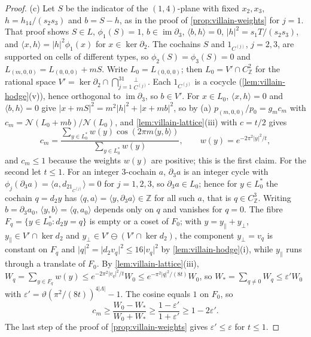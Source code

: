 \documentclass[11pt,a4paper]{amsart}
\theoremstyle{definition}
\theoremstyle{remark}
\numberwithin{equation}{section}
\newcommand{\Z}{\mathbb{Z}}          %
\newcommand{\ip}[2]{\langle #1,#2\rangle}  %
\newcommand{\abs}[1]{\lvert #1\rvert}      %
\begin{document}
\begin{proof}
(c) Let $S$ be the indicator of the $(1,4)$-plane with fixed $x_2,x_3$, $h=h_{14}/(s_2s_3)$ and $b=S-h$, as in the proof of \cref{prop:villain-weights} for $j=1$. That proof shows $S\in L$, $\phi_1(S)=1$, $b\in\operatorname{im}\partial_3$, $\ip bh=0$, $\abs h^2=s_1T/(s_2s_3)$, and $\ip xh=\abs h^2\phi_1(x)$ for $x\in\ker\partial_2$. The cochains $S$ and $1_{C^{(j)}}$, $j=2,3$, are supported on cells of different types, so $\phi_2(S)=\phi_3(S)=0$ and $L_{(m,0,0)}=L_{(0,0,0)}+mS$. Write $L_0=L_{(0,0,0)}$; then $L_0=V'\cap C^2_\Z$ for the rational space $V'=\ker\partial_2\cap\bigcap_{j=1}^31_{C^{(j)}}^\perp$. Each $1_{C^{(j)}}$ is a cocycle (\cref{lem:villain-hodge}\textup{(v)}), hence orthogonal to $\operatorname{im}\partial_3$, so $b\in V'$. For $x\in L_0$, $\ip xh=0$ and $\ip bh=0$ give $\abs{x+mS}^2=m^2\abs h^2+\abs{x+mb}^2$, so by (a) $p_{(m,0,0)}/p_0=g_mc_m$ with $c_m=\mathcal N(L_0+mb)/\mathcal N(L_0)$, and \cref{lem:villain-lattice}\textup{(iii)} with $c=t/2$ gives
\[
c_m=\frac{\sum_{y\in L_0^*}w(y)\cos(2\pi m\ip yb)}{\sum_{y\in L_0^*}w(y)},\qquad w(y)=e^{-2\pi^2\abs y^2/t},
\]
and $c_m\le1$ because the weights $w(y)$ are positive; this is the first claim. For the second let $t\le1$. For an integer $3$-cochain $a$, $\partial_3a$ is an integer cycle with $\phi_j(\partial_3a)=\ip a{d_21_{C^{(j)}}}=0$ for $j=1,2,3$, so $\partial_3a\in L_0$; hence for $y\in L_0^*$ the cochain $q=d_2y$ has $\ip qa=\ip y{\partial_3a}\in\Z$ for all such $a$, that is $q\in C^3_\Z$. Writing $b=\partial_3a_0$, $\ip yb=\ip q{a_0}$ depends only on $q$ and vanishes for $q=0$. The fibre $F_q=\{y\in L_0^*:d_2y=q\}$ is empty or a coset of $F_0$; with $y=y_\parallel+y_\perp$, $y_\parallel\in V'\cap\ker d_2$ and $y_\perp\in V'\ominus(V'\cap\ker d_2)$, the component $y_\perp=v_q$ is constant on $F_q$ and $\abs q^2=\abs{d_2v_q}^2\le16\abs{v_q}^2$ by \cref{lem:villain-hodge}\textup{(i)}, while $y_\parallel$ runs through a translate of $F_0$. By \cref{lem:villain-lattice}\textup{(iii)}, $W_q=\sum_{y\in F_q}w(y)\le e^{-2\pi^2\abs{v_q}^2/t}W_0\le e^{-\pi^2\abs q^2/(8t)}W_0$, so $W_*=\sum_{q\ne0}W_q\le\varepsilon'W_0$ with $\varepsilon'=\vartheta(\pi^2/(8t))^{4\abs\Lambda}-1$. The cosine equals $1$ on $F_0$, so
\[
c_m\ge\frac{W_0-W_*}{W_0+W_*}\ge\frac{1-\varepsilon'}{1+\varepsilon'}\ge1-2\varepsilon' .
\]
The last step of the proof of \cref{prop:villain-weights} gives $\varepsilon'\le\varepsilon$ for $t\le1$.
\end{proof}
\end{document}

